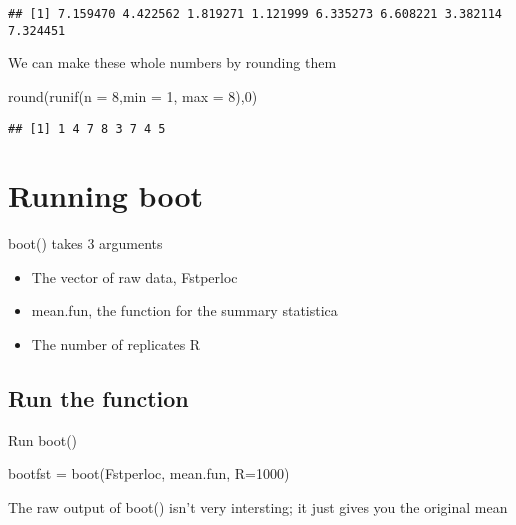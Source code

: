 \documentclass[
]{book}
\newenvironment{Shaded}{\begin{snugshade}}{\end{snugshade}}
\newcommand{\AttributeTok}[1]{\textcolor[rgb]{0.77,0.63,0.00}{#1}}
\newcommand{\DecValTok}[1]{\textcolor[rgb]{0.00,0.00,0.81}{#1}}
\newcommand{\FunctionTok}[1]{\textcolor[rgb]{0.00,0.00,0.00}{#1}}
\newcommand{\NormalTok}[1]{#1}
\newcommand{\OtherTok}[1]{\textcolor[rgb]{0.56,0.35,0.01}{#1}}
\providecommand{\tightlist}{%
  \setlength{\itemsep}{0pt}\setlength{\parskip}{0pt}}
\begin{document}
\begin{verbatim}
## [1] 7.159470 4.422562 1.819271 1.121999 6.335273 6.608221 3.382114 7.324451
\end{verbatim}

We can make these whole numbers by rounding them

\begin{Shaded}
\begin{Highlighting}[]
\FunctionTok{round}\NormalTok{(}\FunctionTok{runif}\NormalTok{(}\AttributeTok{n =} \DecValTok{8}\NormalTok{,}\AttributeTok{min =} \DecValTok{1}\NormalTok{, }\AttributeTok{max =} \DecValTok{8}\NormalTok{),}\DecValTok{0}\NormalTok{)}
\end{Highlighting}
\end{Shaded}

\begin{verbatim}
## [1] 1 4 7 8 3 7 4 5
\end{verbatim}

\hypertarget{running-boot}{%
\section{Running boot}\label{running-boot}}

boot() takes 3 arguments

\begin{itemize}
\tightlist
\item
  The vector of raw data, Fstperloc
\item
  mean.fun, the function for the summary statistica
\item
  The number of replicates R
\end{itemize}

\hypertarget{run-the-function}{%
\subsection{Run the function}\label{run-the-function}}

Run boot()

\begin{Shaded}
\begin{Highlighting}[]
\NormalTok{bootfst }\OtherTok{=} \FunctionTok{boot}\NormalTok{(Fstperloc, mean.fun, }\AttributeTok{R=}\DecValTok{1000}\NormalTok{)}
\end{Highlighting}
\end{Shaded}

The raw output of boot() isn't very intersting; it just gives you the original mean
\end{document}
